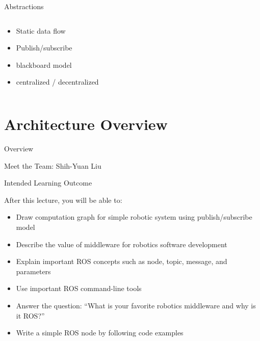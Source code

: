 \documentclass[aspectratio=43]{beamer}
\begin{document}
\begin{frame}{Abstractions}
	\begin{columns}
		\begin{column}{0.6\textwidth}
			\begin{itemize}
				\item Static data flow
                                \item Publish/subscribe
                                \item blackboard model
                                \item centralized / decentralized
			\end{itemize}
		\end{column}
		\begin{column}{0.4\textwidth}
			\centering
		\end{column}
	\end{columns}
\end{frame}


\section{Architecture Overview}
\begin{frame}[label=overview]{Overview}
	\tableofcontents[sectionstyle=show/shaded,subsectionstyle=show/shaded/shaded]
\end{frame}

\begin{frame}{Meet the Team: Shih-Yuan Liu}
\end{frame}

\begin{frame}{Intended Learning Outcome}
	\begin{block}{After this lecture, you will be able to:}
	\begin{itemize}[<+->]
		\item Draw computation graph for simple robotic system using publish/subscribe model
		\item Describe the value of middleware for robotics software development
		\item Explain important ROS concepts such as node, topic, message, and parameters
		\item Use important ROS command-line tools
		\item Answer the question: ``What is your favorite robotics middleware and why is it ROS?''
		\item Write a simple ROS node by following code examples
	\end{itemize}
	\end{block}
\end{frame}
\end{document}
